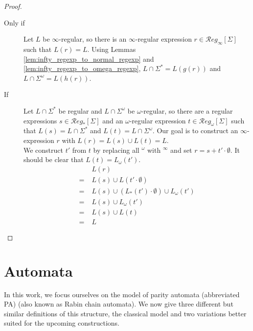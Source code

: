\begin{proof}
	\begin{description}
	\item[Only if] Let $L$ be $\infty$-regular, so there is an $\infty$-regular expression $r \in \mathcal{R}eg_\infty[\Sigma]$ such that $L(r) = L$. Using Lemmas \ref{lem:infty_regexp_to_normal_regexp} and \ref{lem:infty_regexp_to_omega_regexp}, $L \cap \Sigma^* = L(g(r))$ and $L \cap \Sigma^\omega = L(h(r))$.
	
	\item[If] Let $L \cap \Sigma^*$ be regular and $L \cap \Sigma^\omega$ be $\omega$-regular, so there are a regular expressions $s \in \mathcal{R}eg_*[\Sigma]$ and an $\omega$-regular expression $t \in \mathcal{R}eg_\omega[\Sigma]$ such that $L(s) = L \cap \Sigma^*$ and $L(t) = L \cap \Sigma^\omega$. Our goal is to construct an $\infty$-expression $r$ with $L(r) = L(s) \cup L(t) = L$. \\
		We construct $t'$ from $t$ by replacing all $^\omega$ with $^\infty$ and set $r = s + t' \cdot \emptyset$. It should be clear that $L(t) = L_\omega(t')$.
		\begin{align*}
			& L(r) \\
			=\;& L(s) \cup L(t' \cdot \emptyset) \\
			=\;& L(s) \cup (L_*(t') \cdot \emptyset) \cup L_\omega(t') \\
			=\;& L(s) \cup L_\omega(t') \\
			=\;& L(s) \cup L(t) \\
			=\;& L
		\end{align*}
	\end{description}
\end{proof}




\section{Automata}
In this work, we focus ourselves on the model of parity automata (abbreviated PA) (also known as Rabin chain automata). We now give three different but similar definitions of this structure, the classical model and two variations better suited for the upcoming constructions. 


